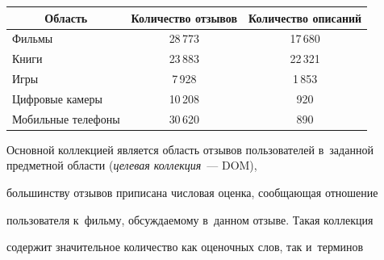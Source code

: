\begin{table}\small


\begin{center}


\parbox{306pt}{





}





\vspace*{2ex}





\begin{tabular}{|l|c|c|}


\hline





\multicolumn{1}{|c|}{Область}&Количество отзывов&Количество описаний\\


\hline


Фильмы&28\,773&17\,680\\


Книги&23\,883&22\,321\\


Игры&\hphantom{9}7\,928&\hphantom{9}1\,853\\


Цифровые камеры&10\,208&\hphantom{99\,}920\\


Мобильные телефоны&30\,620&\hphantom{99\,}890\\


\hline


\end{tabular}


\end{center}


\end{table}





     Основной коллекцией является область отзывов пользователей в~заданной предметной области (\textit{целевая коллекция}~--- DOM),


большинству отзывов приписана числовая оценка, сообщающая отношение


пользователя к~фильму, обсуждаемому в~данном отзыве. Такая коллекция


содержит значительное количество как оценочных слов, так и~терминов


